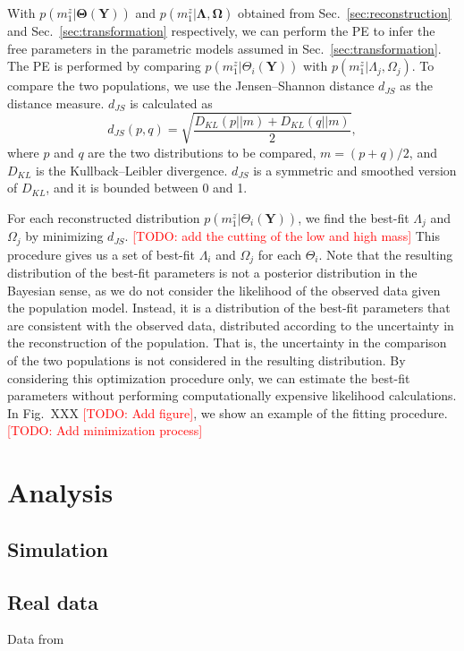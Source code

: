 \documentclass[aps,prd,twocolumn,superscriptaddress,preprintnumbers,nofootinbib,hidelinks]{revtex4-2}
\newcommand{\todo}[1]{\textcolor{red}{[TODO: #1]}}
\begin{document}
With $p(m^z_1|\mathbf{\Theta}(\mathbf{Y}))$ and $p(m^z_1|\mathbf{\Lambda}, \mathbf{\Omega})$ obtained from Sec.~\ref{sec:reconstruction} and Sec.~\ref{sec:transformation} respectively, we can perform the \ac{PE} to infer the free parameters in the parametric models assumed in Sec.~\ref{sec:transformation}.
The \ac{PE} is performed by comparing $p(m^z_1|\Theta_i(\mathbf{Y}))$ with $p(m^z_1|\Lambda_j, \Omega_j)$.
To compare the two populations, we use the Jensen–Shannon distance $d_{JS}$ as the distance measure.
$d_{JS}$ is calculated as
\begin{equation}
    d_{JS}(p, q) = \sqrt{\frac{D_{KL}(p||m) + D_{KL}(q||m)}{2}},
\end{equation}
where $p$ and $q$ are the two distributions to be compared, $m = (p + q) / 2$, and $D_{KL}$ is the Kullback–Leibler divergence.
$d_{JS}$ is a symmetric and smoothed version of $D_{KL}$, and it is bounded between 0 and 1.

For each reconstructed distribution $p(m^z_1|\Theta_i(\mathbf{Y}))$, we find the best-fit $\Lambda_j$ and $\Omega_j$ by minimizing $d_{JS}$.
\todo{add the cutting of the low and high mass}
This procedure gives us a set of best-fit $\Lambda_i$ and $\Omega_j$ for each $\Theta_i$.
Note that the resulting distribution of the best-fit parameters is not a posterior distribution in the Bayesian sense, as we do not consider the likelihood of the observed data given the population model.
Instead, it is a distribution of the best-fit parameters that are consistent with the observed data, distributed according to the uncertainty in the reconstruction of the population.
That is, the uncertainty in the comparison of the two populations is not considered in the resulting distribution.
By considering this optimization procedure only, we can estimate the best-fit parameters without performing computationally expensive likelihood calculations.
In Fig.~XXX \todo{Add figure}, we show an example of the fitting procedure.
\todo{Add minimization process}

\section{Analysis}
\label{sec:analysis}

\subsection{Simulation}
\label{sec:injection-setup}

\subsection{Real data}
\label{sec:real-data-setup}
Data from \citet{LIGOScientific:2019lzm, KAGRA:2023pio}
\end{document}
